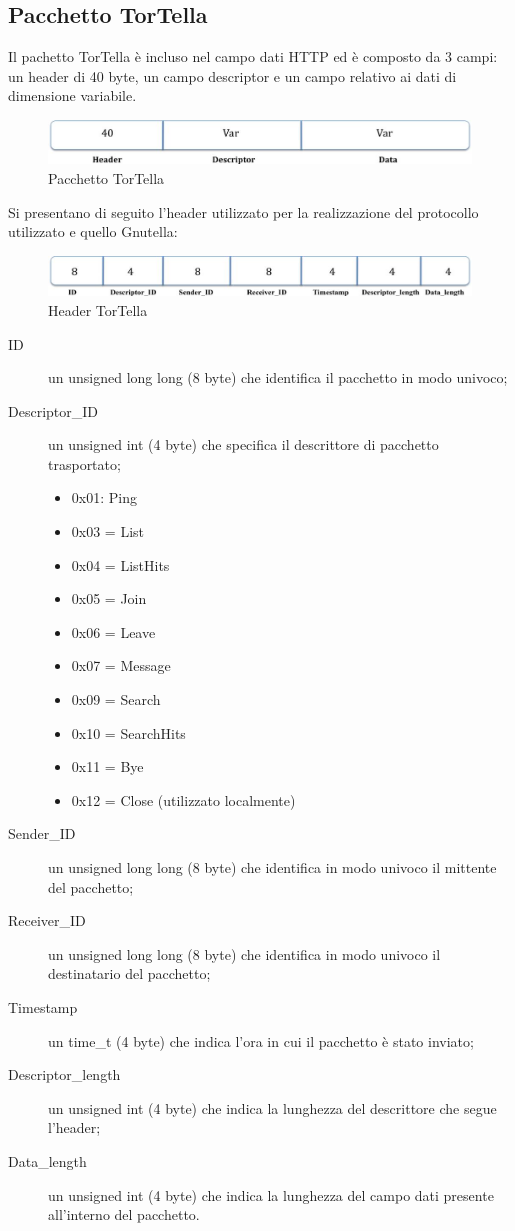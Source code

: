 \subsection{Pacchetto TorTella}
Il pachetto TorTella è incluso nel campo dati HTTP ed è composto da 3 campi: un header di 40 byte, un campo descriptor e un campo relativo ai dati di dimensione variabile.
\begin{figure}[H]
\begin{center}
\includegraphics[scale=0.38]{etc/tortellapacket.jpg}
\caption{Pacchetto TorTella}
\label{tortellapacket}
\end{center}
\end{figure}
Si presentano di seguito l’header utilizzato per la realizzazione del protocollo utilizzato e quello Gnutella:
\begin{figure}[H]
\begin{center}
\includegraphics[scale=0.38]{etc/tortellaheader.jpg}
\caption{Header TorTella}
\label{tortellaheader}
\end{center}
\end{figure}
\begin{description}
\item[ID] un unsigned long long (8 byte) che identifica il pacchetto in modo univoco;
\item[Descriptor\_ID] un unsigned int (4 byte) che specifica il descrittore di pacchetto trasportato;
\begin{itemize}
	\item 0x01: Ping
	\item 0x03 = List
	\item 0x04 = ListHits
	\item 0x05 = Join
	\item 0x06 = Leave
	\item 0x07 = Message
	\item 0x09 = Search
	\item 0x10 = SearchHits
	\item 0x11 = Bye
	\item 0x12 = Close (utilizzato localmente)
\end{itemize}
\item[Sender\_ID] un unsigned long long (8 byte) che identifica in modo univoco il mittente del pacchetto;
\item[Receiver\_ID] un unsigned long long (8 byte) che identifica in modo univoco il destinatario del pacchetto;
\item[Timestamp] un time\_t (4 byte) che indica l’ora in cui il pacchetto è stato inviato;
\item[Descriptor\_length] un unsigned int (4 byte) che indica la lunghezza del descrittore che segue l’header;
\item[Data\_length] un unsigned int (4 byte) che indica la lunghezza del campo dati presente all’interno del pacchetto.
\end{description}
